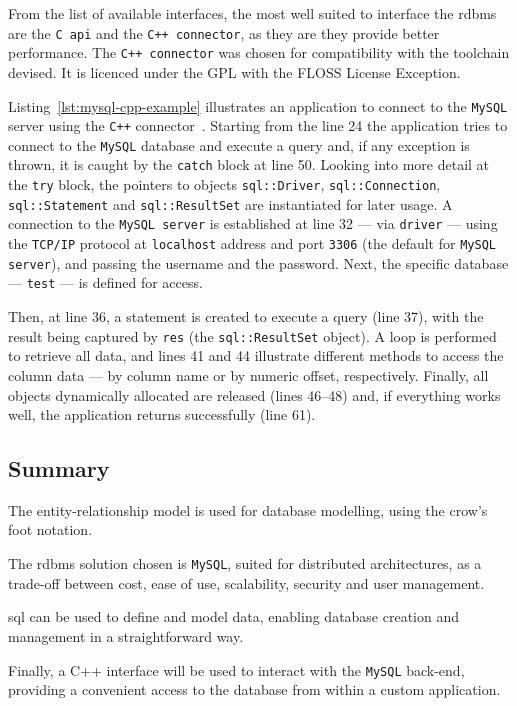 From the list of available interfaces, the most well suited to interface the
\gls{rdbms} are the \texttt{C \gls{api}} and the \texttt{C++ connector}, as they
are they provide better performance.
The \texttt{C++ connector} was chosen for compatibility with the toolchain
devised. It is licenced under the GPL with the FLOSS License Exception.

Listing~\ref{lst:mysql-cpp-example} illustrates an application to connect
to the \texttt{MySQL} server using the \texttt{C++} connector~\cite{MysqlConnC++Example1}. Starting from the
line 24 the application tries to connect to the \texttt{MySQL} database and
execute a query and, if any exception is thrown, it is caught by the
\texttt{catch} block at line 50.
Looking into more detail at the \texttt{try} block, the pointers to objects \texttt{sql::Driver},
\texttt{sql::Connection}, \texttt{sql::Statement} and \texttt{sql::ResultSet}
are instantiated for later usage. A connection to the \texttt{MySQL server} is
established  at line 32 --- via \texttt{driver} --- using the \texttt{TCP/IP}
protocol at \texttt{localhost} address and port \texttt{3306} (the default for \texttt{MySQL server}), and passing the
username and the password. Next, the specific database --- \texttt{test} --- is
defined for access.

Then, at line 36, a statement is created to execute a query (line 37), with the
result being captured by \texttt{res} (the \texttt{sql::ResultSet} object). A
loop is performed to retrieve all data, and lines 41 and 44 illustrate different
methods to access the column data --- by column name or by numeric offset,
respectively. Finally, all objects dynamically allocated are released (lines
46--48) and, if everything works well, the application returns successfully
(line 61).
%


\subsection{Summary}%
\label{sec:summary}
The entity-relationship model is used for database modelling, using the
crow's foot notation.

The \gls{rdbms} solution chosen is \texttt{MySQL}, suited for distributed
architectures, as a trade-off between cost, ease of use, scalability, security
and user management.

\gls{sql} can be used to define and model data, enabling database creation and
management in a straightforward way.

Finally, a C++ interface will be used to interact with the \texttt{MySQL}
back-end, providing a convenient access to the database from within a custom application.
%
